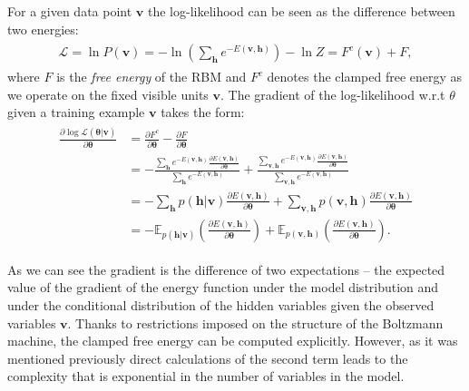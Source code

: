 For a given data point $\mathbf{v}$ the log-likelihood can be seen as the difference between two energies:
\begin{align}
\begin{split}
\mathcal{L} = \ln P(\mathbf{v}) = -\ln (\sum_{\mathbf{h}} e^{-E(\mathbf{v,h})} ) -\ln Z = F^c(\mathbf{v}) + F,
\end{split}
\label{eq:loglikelihood}
\end{align}
where $F$ is the \emph{free energy} of the RBM and $F^c$ denotes the clamped free energy as we operate on the fixed visible units $\mathbf{v}$. The gradient of the log-likelihood w.r.t $\theta$ given a training example $\mathbf{v}$ takes the form:
\begin{align}
\begin{split}
\frac{\partial \log \mathcal{L}(\mathbf{\theta  | \mathbf{v}})}{\partial \mathbf{\theta}} & = \frac{\partial F^c }{\partial \mathbf{\theta}} - \frac{\partial F }{\partial \mathbf{\theta}} \\
& = - \frac{\sum_{\mathbf{h}} e^{-E(\mathbf{v,h})} \frac{\partial E(\mathbf{v,h})}{\partial \mathbf{\theta}}}{\sum_{\mathbf{h}} e^{-E(\mathbf{v,h})}} + \frac{\sum_{\mathbf{v, h}} e^{-E(\mathbf{v,h})} \frac{\partial E(\mathbf{v,h})}{\partial \mathbf{\theta}}}{\sum_{\mathbf{v, h}} e^{-E(\mathbf{v,h})}} \\
& = - \sum_\mathbf{h} p(\mathbf{h} | \mathbf{v}) \frac{\partial E(\mathbf{v,h})}{\partial \mathbf{\theta}} +  \sum_\mathbf{v, h} p(\mathbf{v}, \mathbf{h}) \frac{\partial E(\mathbf{v,h})}{\partial \mathbf{\theta}} \\
& =  - \mathbb{E}_{p(\mathbf{h} | \mathbf{v})} \left( \frac{\partial E(\mathbf{v,h})}{\partial \mathbf{\theta}} \right) + \mathbb{E}_{ p(\mathbf{v,h}) } \left( \frac{\partial E(\mathbf{v,h})}{\partial \mathbf{\theta}} \right).
\label{eq:gradient}
\end{split}
\end{align}

As we can see the gradient is the difference of two expectations -- the expected value of the gradient of the energy function under the model distribution and under the conditional distribution of the hidden variables given the observed variables $\mathbf{v}$. Thanks to restrictions imposed on the structure of the Boltzmann machine, the clamped free energy can be computed explicitly. However, as it was mentioned previously direct calculations of the second term leads to the complexity that is exponential in the number of variables in the model.

